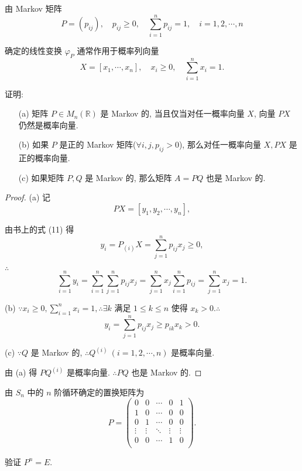 \documentclass{ctexart}
\begin{document}
\begin{exercise}%
    由 Markov 矩阵
    \[P=(p_{ij}),\quad p_{ij}\geq0,\quad\sum\limits_{i=1}^np_{ij}=1,\quad i=1,2,\cdots,n\]
    
    确定的线性变换 $\varphi_P$ 通常作用于概率列向量
    \[X=[x_1,\cdots,x_n],\quad x_i\geq0,\quad\sum\limits_{i=1}^nx_i=1.\]
    
    证明:
    \begin{itemize}
        \item[(a)] 矩阵 $P\in M_n(\mathbb{R})$ 是 Markov 的, 当且仅当对任一概率向量 $X$, 向量 $PX$ 仍然是概率向量.
        \item[(b)] 如果 $P$ 是正的 Markov 矩阵($\forall i,j,p_{ij}>0$), 那么对任一概率向量 $X,PX$ 是正的概率向量.
        \item[(c)] 如果矩阵 $P,Q$ 是 Markov 的, 那么矩阵 $A=PQ$ 也是 Markov 的.
    \end{itemize}
\end{exercise}
\begin{proof}
    (a) 记
    \[PX=[y_1,y_2,\cdots,y_n],\]

    由书上的式 (11) 得
    \[y_i=P_{(i)}X=\sum\limits_{j=1}^np_{ij}x_{j}\geq0,\]

    $\therefore$
    \[\sum\limits_{i=1}^ny_i=\sum\limits_{i=1}^n\sum\limits_{j=1}^np_{ij}x_{j}=\sum\limits_{j=1}^nx_{j}\sum\limits_{i=1}^np_{ij}=\sum\limits_{j=1}^nx_{j}=1.\]

    (b) $\because x_i\geq0,\sum\limits_{i=1}^nx_i=1,\therefore\exists k$ 满足 $1\leq k\leq n$ 使得 $x_k>0.\therefore$
    \[y_i=\sum\limits_{j=1}^np_{ij}x_{j}\geq p_{ik}x_k>0.\]

    (c) $\because Q$ 是 Markov 的, $\therefore Q^{(i)}\ (i=1,2,\cdots,n)$ 是概率向量.

    由 (a) 得 $PQ^{(i)}$ 是概率向量. $\therefore PQ$ 也是 Markov 的.
\end{proof}
\begin{exercise}%
    由 $S_n$ 中的 $n$ 阶循环确定的置换矩阵为
    \[P=\begin{pmatrix}
        0 & 0 & \cdots & 0 & 1 \\
        1 & 0 & \cdots & 0 & 0 \\
        0 & 1 & \cdots & 0 & 0 \\
        \vdots & \vdots & \ddots & \vdots & \vdots \\
        0 & 0 & \cdots & 1 & 0 \\
    \end{pmatrix}.\]

    验证 $P^n=E$.
\end{exercise}
\end{document}

